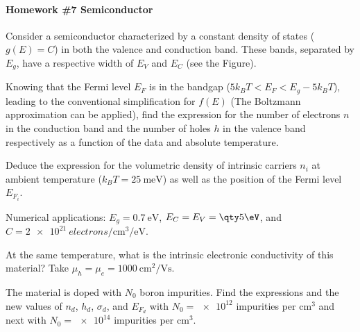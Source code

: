
\paragraph{Homework \#7 Semiconductor}

\begin{wrapstuff}[width = .32\linewidth]
  \centering
\end{wrapstuff}
\begin{problem}
  Consider a semiconductor characterized by a constant density of states
  ($g(E) = C$) in both the valence and conduction band. These bands,
  separated by $E_g$, have a respective width of $E_V$ and $E_C$
  (see the Figure).
  \wrapstuffclear
  \begin{enumext}
    \item Knowing that the Fermi level $E_F$ is in the bandgap
    ($5k_BT < E_F < E_g - 5k_BT$), leading to the conventional simplification
    for $f(E)$ (The Boltzmann approximation can be applied), find the
    expression for the number of electrons $n$ in the conduction band and the
    number of holes $h$ in the valence band respectively as a function of the
    data and absolute temperature.
  \end{enumext}
  \begin{enumext}[topsep = 0pt]
    \setcounter{enumXi}{1}
    \item Deduce the expression for the volumetric density of intrinsic
    carriers $n_i$ at ambient temperature ($k_BT = \qty{25}\meV$) as well as
    the position of the Fermi level $E_{F_i}$.

    Numerical applications: $E_g = \qty{0.7}\eV$, $E_C = E_V = \qty5\eV$,
    and $C = \qty{2e21}{electrons/\cm^3/\eV}$.
    \item At the same temperature, what is the intrinsic electronic
    conductivity of this material? Take
    $\mu_h = \mu_e = \qty{1000}{\cm^2/\V\s}$.
    \item The material is doped with $N_0$ boron impurities. Find the
    expressions and the new values of $n_d$, $h_d$, $\sigma_d$, and $E_{F_d}$
    with $N_0 = \num{e12}$ impurities per $\unit{\cm^3}$ and next with
    $N_0 = \num{e14}$ impurities per $\unit{\cm^3}$.
  \end{enumext}
\end{problem}
